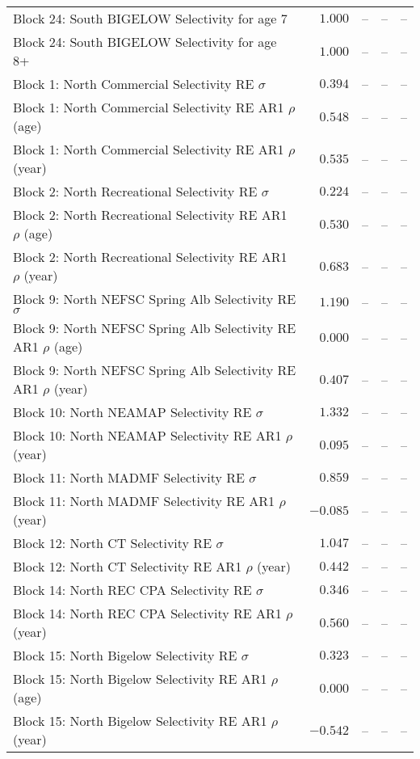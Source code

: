 \documentclass[
]{article}
\begin{document}
\begin{landscape}
\begin{longtable}[t]{lrrrr}
Block 24: South BIGELOW Selectivity for age 7 & $1.000$ & -- & -- & --\\
Block 24: South BIGELOW Selectivity for age 8+ & $1.000$ & -- & -- & --\\
Block 1: North Commercial Selectivity RE $\sigma$ & $0.394$ & -- & -- & --\\
\addlinespace
Block 1: North Commercial Selectivity RE AR1 $\rho$ (age) & $0.548$ & -- & -- & --\\
Block 1: North Commercial Selectivity RE AR1 $\rho$ (year) & $0.535$ & -- & -- & --\\
Block 2: North Recreational Selectivity RE $\sigma$ & $0.224$ & -- & -- & --\\
Block 2: North Recreational Selectivity RE AR1 $\rho$ (age) & $0.530$ & -- & -- & --\\
Block 2: North Recreational Selectivity RE AR1 $\rho$ (year) & $0.683$ & -- & -- & --\\
\addlinespace
Block 9: North NEFSC Spring Alb Selectivity RE $\sigma$ & $1.190$ & -- & -- & --\\
Block 9: North NEFSC Spring Alb Selectivity RE AR1 $\rho$ (age) & $0.000$ & -- & -- & --\\
Block 9: North NEFSC Spring Alb Selectivity RE AR1 $\rho$ (year) & $0.407$ & -- & -- & --\\
Block 10: North NEAMAP Selectivity RE $\sigma$ & $1.332$ & -- & -- & --\\
Block 10: North NEAMAP Selectivity RE AR1 $\rho$ (year) & $0.095$ & -- & -- & --\\
\addlinespace
Block 11: North MADMF Selectivity RE $\sigma$ & $0.859$ & -- & -- & --\\
Block 11: North MADMF Selectivity RE AR1 $\rho$ (year) & $-0.085$ & -- & -- & --\\
Block 12: North CT Selectivity RE $\sigma$ & $1.047$ & -- & -- & --\\
Block 12: North CT Selectivity RE AR1 $\rho$ (year) & $0.442$ & -- & -- & --\\
Block 14: North REC CPA Selectivity RE $\sigma$ & $0.346$ & -- & -- & --\\
\addlinespace
Block 14: North REC CPA Selectivity RE AR1 $\rho$ (year) & $0.560$ & -- & -- & --\\
Block 15: North Bigelow Selectivity RE $\sigma$ & $0.323$ & -- & -- & --\\
Block 15: North Bigelow Selectivity RE AR1 $\rho$ (age) & $0.000$ & -- & -- & --\\
Block 15: North Bigelow Selectivity RE AR1 $\rho$ (year) & $-0.542$ & -- & -- & --\\

\end{longtable}
\end{landscape}
\end{document}

